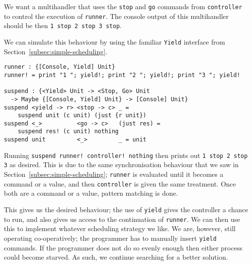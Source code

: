 \documentclass[msc,deptreport,cs]{infthesis} %
\newcommand{\code}[1]{\lstinline{#1}}
\begin{document}

\noindent We want a multihandler that uses the \code{stop} and \code{go} commands from
\code{controller} to control the execution of \code{runner}. The console output
of this multihandler should be then \code{1 stop 2 stop 3 stop}.
%



We can simulate this behaviour by using the familiar \code{Yield} interface from
Section~\ref{subsec:simple-scheduling}.

\begin{lstlisting}
runner : {[Console, Yield] Unit}
runner! = print "1 "; yield!; print "2 "; yield!; print "3 "; yield!

suspend : {<Yield> Unit -> <Stop, Go> Unit
  -> Maybe {[Console, Yield] Unit} -> [Console] Unit}
suspend <yield -> r> <stop -> c> _ =
    suspend unit (c unit) (just {r unit})
suspend <_>          <go -> c>   (just res) =
    suspend res! (c unit) nothing
suspend unit         <_>         _ = unit
\end{lstlisting}

\noindent Running \code{suspend runner! controller! nothing} then prints out
\code{1 stop 2 stop 3} as desired.
%
This is due to the same synchronisation behaviour that we saw in
Section~\ref{subsec:simple-scheduling}; \code{runner} is evaluated until it
becomes a command or a value, and then \code{controller} is given the same
treatment. Once both are a command or a value, pattern matching is done.

This gives us the desired behaviour; the use of \code{yield} gives the
controller a chance to run, and also gives us access to the continuation of
\code{runner}. We can then use this to implement whatever scheduling strategy we
like.
%
We are, however, still operating co-operatively; the programmer has to manually
insert \code{yield} commands. If the programmer does not do so evenly enough
then either process could become starved. As such, we continue searching for a
better solution.
\end{document}
